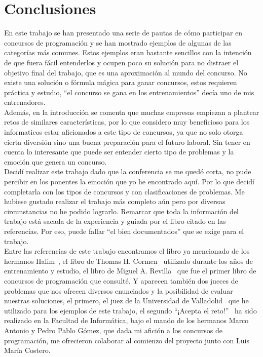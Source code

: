 \chapter{Conclusiones}
\label{ch:conclusiones}

En este trabajo se han presentado una serie de pautas de cómo
participar en concursos de programación y se han mostrado ejemplos de
algunas de las categorías más comunes. Estos ejemplos eran bastante
sencillos con la intención de que fuera fácil entenderlos y ocupen
poco su solución para no distraer el objetivo final del trabajo, que
es una aproximación al mundo del concurso. No existe una solución o
fórmula mágica para ganar concursos, estos requieren práctica y
estudio, “el concurso se gana en los entrenamientos” decía uno de mis
entrenadores.\\

Además, en la introducción se comenta que muchas empresas empiezan a
plantear retos de similares características, por lo que considero muy
beneficioso para los informaticos estar aficionados a este tipo de
concursos, ya que no solo otorga cierta diversión sino una buena
preparación para el futuro laboral. Sin tener en cuenta lo interesante
que puede ser entender cierto tipo de problemas y la emoción que
genera un concurso.\\

Decidí realizar este trabajo dado que la conferencia se me quedó
corta, no pude percibir en los ponentes la emoción que yo he
encontrado aquí. Por lo que decidí completarla con los tipos de
concursos y con clasificaciones de problemas. Me hubiese gustado
realizar el trabajo más completo aún pero por diversas circunstancias
no he podido lograrlo. Remarcar que toda la información del trabajo
está sacada de la experiencia y guiada por el libro citado en las
referencias. Por eso, puede fallar “el bien documentados” que se exige
para el trabajo.\\

Entre las referencias de este trabajo encontramos el libro ya
mencionado de los hermanos Halim~\cite{halim}, el libro de Thomas
H. Cormen~\cite{cormen} utilizado durante los años de entrenamiento y
estudio, el libro de Miguel A. Revilla~\cite{revilla} que fue el
primer libro de concursos de programación que consulté. Y aparecen
también dos jueces de problemas que nos ofrecen diversos enunciados y
la posibilidad de evaluar nuestras soluciones, el primero, el juez de
la Universidad de Valladolid~\cite{uva} que he utilizado para los
ejemplos de este trabajo, el segundo ``¡Acepta el reto!''~\cite{acr}
ha sido realizado en la Facultad de Informática, bajo el mando de los
hermanos Marco Antonio y Pedro Pablo Gómez, que dada mi afición a los
concursos de programación, me ofrecieron colaborar al comienzo del
proyecto junto con Luis María Costero.
